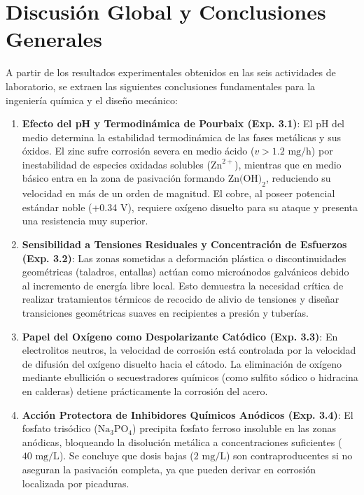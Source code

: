 \documentclass[11pt,a4paper]{article}
\begin{document}
\section{Discusión Global y Conclusiones Generales}
A partir de los resultados experimentales obtenidos en las seis actividades de laboratorio, se extraen las siguientes conclusiones fundamentales para la ingeniería química y el diseño mecánico:

\begin{enumerate}
    \item \textbf{Efecto del pH y Termodinámica de Pourbaix (Exp. 3.1)}:
    El pH del medio determina la estabilidad termodinámica de las fases metálicas y sus óxidos. El zinc sufre corrosión severa en medio ácido ($v > 1.2\text{ mg/h}$) por inestabilidad de especies oxidadas solubles ($\text{Zn}^{2+}$), mientras que en medio básico entra en la zona de pasivación formando $\text{Zn(OH)}_2$, reduciendo su velocidad en más de un orden de magnitud. El cobre, al poseer potencial estándar noble (+0.34 V), requiere oxígeno disuelto para su ataque y presenta una resistencia muy superior.

    \item \textbf{Sensibilidad a Tensiones Residuales y Concentración de Esfuerzos (Exp. 3.2)}:
    Las zonas sometidas a deformación plástica o discontinuidades geométricas (taladros, entallas) actúan como microánodos galvánicos debido al incremento de energía libre local. Esto demuestra la necesidad crítica de realizar tratamientos térmicos de recocido de alivio de tensiones y diseñar transiciones geométricas suaves en recipientes a presión y tuberías.

    \item \textbf{Papel del Oxígeno como Despolarizante Catódico (Exp. 3.3)}:
    En electrolitos neutros, la velocidad de corrosión está controlada por la velocidad de difusión del oxígeno disuelto hacia el cátodo. La eliminación de oxígeno mediante ebullición o secuestradores químicos (como sulfito sódico o hidracina en calderas) detiene prácticamente la corrosión del acero.

    \item \textbf{Acción Protectora de Inhibidores Químicos Anódicos (Exp. 3.4)}:
    El fosfato trisódico ($\text{Na}_3\text{PO}_4$) precipita fosfato ferroso insoluble en las zonas anódicas, bloqueando la disolución metálica a concentraciones suficientes ($40\text{ mg/L}$). Se concluye que dosis bajas ($2\text{ mg/L}$) son contraproducentes si no aseguran la pasivación completa, ya que pueden derivar en corrosión localizada por picaduras.


\end{enumerate}
\end{document}
